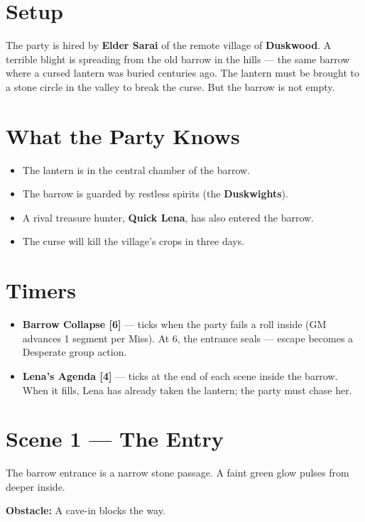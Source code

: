 \documentclass[11pt]{book}
\begin{document}
\section{Setup}

The party is hired by \textbf{Elder Sarai} of the remote village of \textbf{Duskwood}. A terrible blight is spreading from the old barrow in the hills --- the same barrow where a cursed lantern was buried centuries ago. The lantern must be brought to a stone circle in the valley to break the curse. But the barrow is not empty.

\section{What the Party Knows}
\begin{itemize}
  \item The lantern is in the central chamber of the barrow.
  \item The barrow is guarded by restless spirits (the \textbf{Duskwights}).
  \item A rival treasure hunter, \textbf{Quick Lena}, has also entered the barrow.
  \item The curse will kill the village's crops in three days.
\end{itemize}

\section{Timers}

\begin{itemize}
  \item \textbf{Barrow Collapse [6]} --- ticks when the party fails a roll inside (GM advances 1 segment per Miss). At 6, the entrance seals --- escape becomes a Desperate group action.
  \item \textbf{Lena's Agenda [4]} --- ticks at the end of each scene inside the barrow. When it fills, Lena has already taken the lantern; the party must chase her.
\end{itemize}

\section{Scene 1 --- The Entry}

The barrow entrance is a narrow stone passage. A faint green glow pulses from deeper inside.

\textbf{Obstacle:} A cave-in blocks the way.
\end{document}
